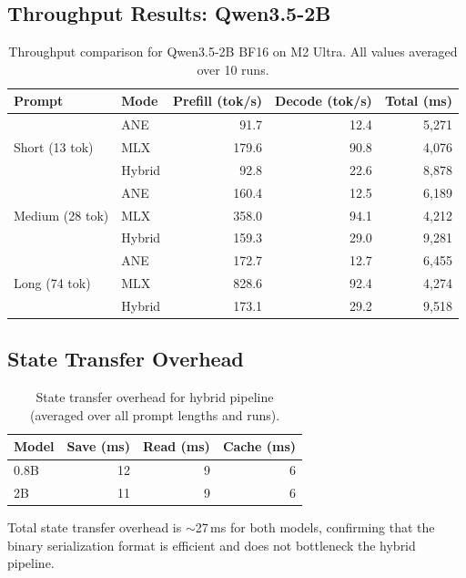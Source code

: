 \documentclass[11pt]{article}
\begin{document}
\subsection{Throughput Results: Qwen3.5-2B}

\begin{table}[h]
\centering
\caption{Throughput comparison for Qwen3.5-2B BF16 on M2 Ultra.
  All values averaged over 10 runs.}
\label{tab:results-2b}
\begin{tabular}{llrrr}
\toprule
Prompt & Mode & Prefill (tok/s) & Decode (tok/s) & Total (ms) \\
\midrule
\multirow{3}{*}{Short (13 tok)}
  & ANE      & 91.7  & 12.4 & 5{,}271 \\
  & MLX      & 179.6 & 90.8 & 4{,}076 \\
  & Hybrid   & 92.8  & 22.6 & 8{,}878 \\
\midrule
\multirow{3}{*}{Medium (28 tok)}
  & ANE      & 160.4 & 12.5 & 6{,}189 \\
  & MLX      & 358.0 & 94.1 & 4{,}212 \\
  & Hybrid   & 159.3 & 29.0 & 9{,}281 \\
\midrule
\multirow{3}{*}{Long (74 tok)}
  & ANE      & 172.7 & 12.7 & 6{,}455 \\
  & MLX      & 828.6 & 92.4 & 4{,}274 \\
  & Hybrid   & 173.1 & 29.2 & 9{,}518 \\
\bottomrule
\end{tabular}
\end{table}

\subsection{State Transfer Overhead}

\begin{table}[h]
\centering
\caption{State transfer overhead for hybrid pipeline (averaged over all
  prompt lengths and runs).}
\label{tab:overhead}
\begin{tabular}{lrrr}
\toprule
Model & Save (ms) & Read (ms) & Cache (ms) \\
\midrule
0.8B & 12 & 9 & 6 \\
2B   & 11 & 9 & 6 \\
\bottomrule
\end{tabular}
\end{table}

Total state transfer overhead is $\sim$27\,ms for both models, confirming
that the binary serialization format is efficient and does not bottleneck
the hybrid pipeline.
\end{document}
